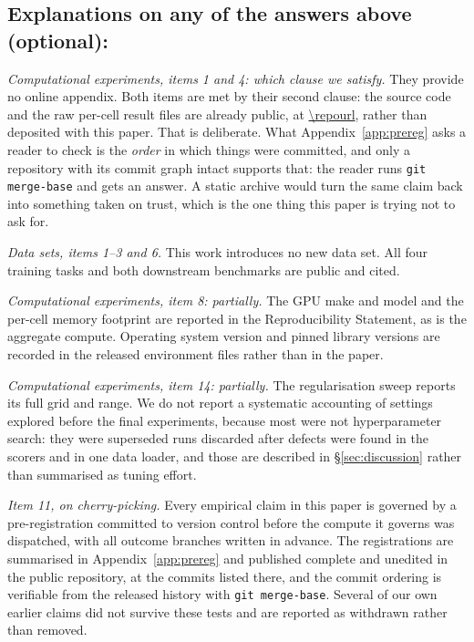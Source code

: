\subsection*{Explanations on any of the answers above (optional):}

\emph{Computational experiments, items 1 and 4: which clause we satisfy.} They
provide no online appendix. Both items are met by their second clause: the
source code and the raw per-cell result files are already public, at
\url{\repourl}, rather than deposited with this paper. That is deliberate.
What Appendix~\ref{app:prereg} asks a reader to check is the \emph{order} in
which things were committed, and only a repository with its commit graph
intact supports that: the reader runs \texttt{git merge-base} and gets an
answer. A static archive would turn the same claim back into something taken
on trust, which is the one thing this paper is trying not to ask for.

\emph{Data sets, items 1--3 and 6.} This work introduces no new data set. All
four training tasks and both downstream benchmarks are public and cited.

\emph{Computational experiments, item 8: partially.} The GPU make and model
and the per-cell memory footprint are reported in the Reproducibility
Statement, as is the aggregate compute. Operating system
version and pinned library versions are recorded in the released environment
files rather than in the paper.

\emph{Computational experiments, item 14: partially.} The regularisation sweep
reports its full grid and range. We do not report a systematic accounting of
settings explored before the final experiments, because most were not
hyperparameter search: they were superseded runs discarded after defects were
found in the scorers and in one data loader, and those are described in
\S\ref{sec:discussion} rather than summarised as tuning effort.

\emph{Item 11, on cherry-picking.} Every empirical claim in this paper is
governed by a pre-registration committed to version control before the compute
it governs was dispatched, with all outcome branches written in advance. The
registrations are summarised in Appendix~\ref{app:prereg} and published
complete and unedited in the public repository, at the commits listed there,
and the commit ordering is verifiable from the released history with
\texttt{git merge-base}. Several of our own earlier
claims did not survive these tests and are reported as withdrawn rather than
removed.
